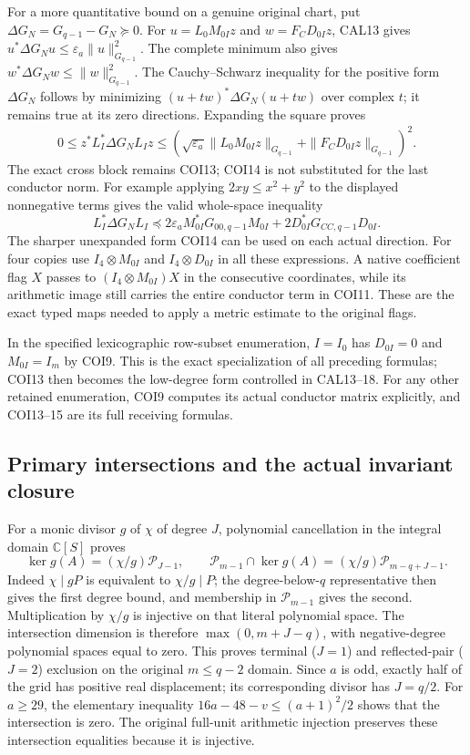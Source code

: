 \documentclass[11pt,a4paper]{article}
\begin{document}
For a more quantitative bound on a genuine original chart, put
$\Delta G_N=G_{q-1}-G_N\succeq0$.
For $u=L_0M_{0I}z$ and $w=F_CD_{0I}z$, CAL13 gives
$u^*\Delta G_Nu\le\varepsilon_a\|u\|_{G_{q-1}}^2$.
The complete minimum also gives
$w^*\Delta G_Nw\le\|w\|_{G_{q-1}}^2$.
The Cauchy--Schwarz inequality for the positive form $\Delta G_N$
follows by minimizing $(u+tw)^*\Delta G_N(u+tw)$ over complex $t$;
it remains true at its zero directions. Expanding the square proves
\[
 \begin{split}
 0\le z^*L_I^*\Delta G_NL_Iz
 \le\left(\sqrt{\varepsilon_a}
       \|L_0M_{0I}z\|_{G_{q-1}}
       +\|F_CD_{0I}z\|_{G_{q-1}}\right)^2.
 \end{split}                                                     \tag{COI14}
\]
The exact cross block remains COI13; COI14 is not substituted for
the last conductor norm. For example applying
$2xy\le x^2+y^2$ to the displayed nonnegative terms gives
the valid whole-space inequality
\[
 L_I^*\Delta G_NL_I
 \preceq2\varepsilon_a M_{0I}^*G_{00,q-1}M_{0I}
             +2D_{0I}^*G_{CC,q-1}D_{0I}.
 \tag{COI15}
\]
The sharper unexpanded form COI14 can be used on each actual
direction. For four copies use $I_4\otimes M_{0I}$ and
$I_4\otimes D_{0I}$ in all these expressions. A native coefficient
flag $X$ passes to $(I_4\otimes M_{0I})X$ in the consecutive
coordinates, while its arithmetic image still carries the entire
conductor term in COI11. These are the exact typed maps needed to
apply a metric estimate to the original flags.

In the specified lexicographic row-subset enumeration, $I=I_0$
has $D_{0I}=0$ and $M_{0I}=I_m$ by COI9. This is the exact
specialization of all preceding formulas; COI13 then becomes the
low-degree form controlled in CAL13--18. For any other retained
enumeration, COI9 computes its actual conductor matrix explicitly,
and COI13--15 are its full receiving formulas.

\subsection{Primary intersections and the actual invariant closure}

For a monic divisor $g$ of $\chi$ of degree $J$, polynomial
cancellation in the integral domain $\mathbb C[S]$ proves
\[
 \ker g(A)=(\chi/g)\mathcal P_{J-1},\qquad
 \mathcal P_{m-1}\cap\ker g(A)
      =(\chi/g)\mathcal P_{m-q+J-1}.
 \tag{COI16}
\]
Indeed $\chi\mid gP$ is equivalent to $\chi/g\mid P$;
the degree-below-$q$ representative then gives the first degree
bound, and membership in $\mathcal P_{m-1}$ gives the second.
Multiplication by $\chi/g$ is injective on that literal polynomial
space. The intersection dimension is therefore
$\max(0,m+J-q)$, with negative-degree polynomial spaces equal
to zero. This proves terminal ($J=1$) and reflected-pair ($J=2$)
exclusion on the original $m\le q-2$ domain.
Since $a$ is odd, exactly half of the grid has positive real
displacement; its corresponding divisor has $J=q/2$.
For $a\ge29$, the elementary inequality
$16a-48-v\le(a+1)^2/2$ shows that the intersection is zero.
The original full-unit arithmetic injection preserves these
intersection equalities because it is injective.
\end{document}
